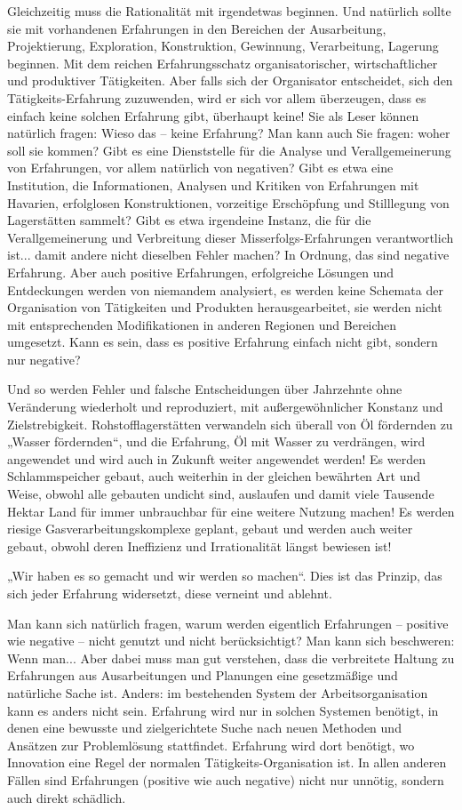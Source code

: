 \documentclass[11pt,a4paper]{article}
\begin{document}
Gleichzeitig muss die Rationalität mit irgendetwas beginnen. Und natürlich
sollte sie mit vorhandenen Erfahrungen in den Bereichen der Ausarbeitung,
Projektierung, Exploration, Konstruktion, Gewinnung, Verarbeitung, Lagerung
beginnen. Mit dem reichen Erfahrungsschatz organisatorischer, wirtschaftlicher
und produktiver Tätigkeiten. Aber falls sich der Organisator entscheidet, sich
den Tätigkeits-Erfahrung zuzuwenden, wird er sich vor allem überzeugen, dass
es einfach keine solchen Erfahrung gibt, überhaupt keine! Sie als Leser können
natürlich fragen: Wieso das -- keine Erfahrung? Man kann auch Sie fragen:
woher soll sie kommen?  Gibt es eine Dienststelle für die Analyse und
Verallgemeinerung von Erfahrungen, vor allem natürlich von negativen?  Gibt es
etwa eine Institution, die Informationen, Analysen und Kritiken von
Erfahrungen mit Havarien, erfolglosen Konstruktionen, vorzeitige Erschöpfung
und Still\-legung von Lagerstätten sammelt? Gibt es etwa irgendeine Instanz,
die für die Verallgemeinerung und Verbreitung dieser Misserfolgs-Erfahrungen
verantwortlich ist... damit andere nicht dieselben Fehler machen? In Ordnung,
das sind negative Erfahrung. Aber auch positive Erfahrungen, erfolgreiche
Lösungen und Entdeckungen werden von niemandem analysiert, es werden keine
Schemata der Organisation von Tätigkeiten und Produkten herausgearbeitet, sie
werden nicht mit entsprechenden Modifikationen in anderen Regionen und
Bereichen umgesetzt. Kann es sein, dass es positive Erfahrung einfach nicht
gibt, sondern nur negative?

Und so werden Fehler und falsche Entscheidungen über Jahrzehnte ohne
Veränderung wiederholt und reproduziert, mit außergewöhnlicher Konstanz und
Zielstrebigkeit.  Rohstoff\-lagerstätten verwandeln sich überall von Öl
fördernden zu „Wasser fördernden“, und die Erfahrung, Öl mit Wasser zu
verdrängen, wird angewendet und wird auch in Zukunft weiter angewendet werden!
Es werden Schlammspeicher gebaut, auch weiterhin in der gleichen bewährten Art
und Weise, obwohl alle gebauten undicht sind, auslaufen und damit viele
Tausende Hektar Land für immer unbrauchbar für eine weitere Nutzung machen!
Es werden riesige Gasverarbeitungskomplexe geplant, gebaut und werden auch
weiter gebaut, obwohl deren Ineffizienz und Irrationalität längst bewiesen
ist!

„Wir haben es so gemacht und wir werden so machen“. Dies ist das Prinzip, das
sich jeder Erfahrung widersetzt, diese verneint und ablehnt.

Man kann sich natürlich fragen, warum werden eigentlich Erfahrungen --
positive wie negative -- nicht genutzt und nicht berücksichtigt? Man kann sich
beschweren: Wenn man...  Aber dabei muss man gut verstehen, dass die
verbreitete Haltung zu Erfahrungen aus Ausarbeitungen und Planungen eine
gesetzmäßige und natürliche Sache ist.  Anders: im bestehenden System der
Arbeitsorganisation kann es anders nicht sein. Erfahrung wird nur in solchen
Systemen benötigt, in denen eine bewusste und zielgerichtete Suche nach neuen
Methoden und Ansätzen zur Problemlösung stattfindet. Erfahrung wird dort
benötigt, wo Innovation eine Regel der normalen Tätigkeits-Organisation ist.
In allen anderen Fällen sind Erfahrungen (positive wie auch negative) nicht
nur unnötig, sondern auch direkt schädlich.
\end{document}
